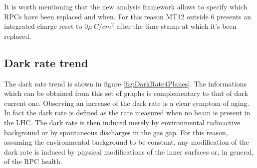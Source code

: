 It is worth mentioning that the new analysis framework allows to specify which RPCs have been replaced and when.
For this reason MT12 outside 6 presents an integrated charge reset to $0\mu~C/cm^2$ after the time-stamp at which it's been replaced. 

\subsection{Dark rate trend}
The dark rate trend is shown in figure \ref{fig:DarkRate4Planes}.
The informations which can be obtained from this set of graphs is complementary to that of dark current one.
Observing an increase of the dark rate is a clear symptom of aging.
In fact the dark rate is defined as the rate measured when no beam is present in the LHC.
The dark rate is then induced merely by environmental radioactive background or by spontaneous discharges in the gas gap.
For this reason, assuming the environmental background to be constant, any modification of the dark rate is induced by physical modifications of the inner surfaces or, in general, of the RPC health.

